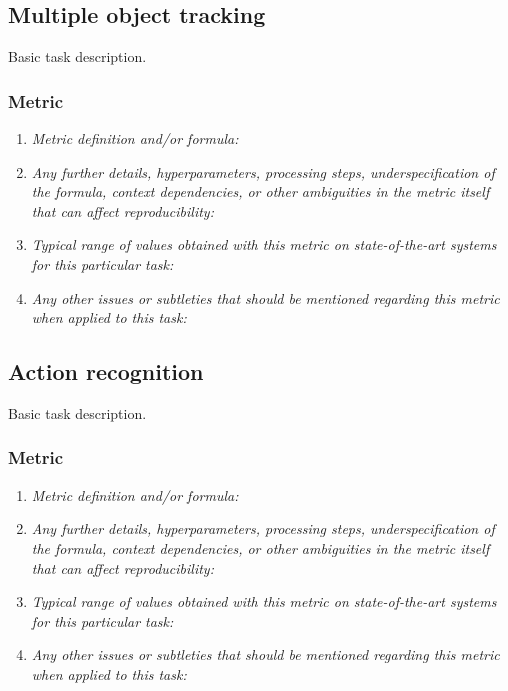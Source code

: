 \documentclass[a4paper,11pt]{article}
\begin{document}
\subsection{Multiple object tracking}
    Basic task description.
    \subsubsection{Metric}
        \begin{enumerate}[label=\alph*.]
            \item \textit{Metric definition and/or formula:}
            \bigskip
            \item \textit{Any further details, hyperparameters, processing steps, underspecification of the formula, context dependencies, or other ambiguities in the metric itself that can affect reproducibility:}
            \bigskip
            \item \textit{Typical range of values obtained with this metric on state-of-the-art systems for this particular task:}
            \bigskip
            \item \textit{Any other issues or subtleties that should be mentioned regarding this metric when applied to this task:}
            \bigskip
        \end{enumerate}

\subsection{Action recognition}
    Basic task description.
    \subsubsection{Metric}
        \begin{enumerate}[label=\alph*.]
            \item \textit{Metric definition and/or formula:}
            \bigskip
            \item \textit{Any further details, hyperparameters, processing steps, underspecification of the formula, context dependencies, or other ambiguities in the metric itself that can affect reproducibility:}
            \bigskip
            \item \textit{Typical range of values obtained with this metric on state-of-the-art systems for this particular task:}
            \bigskip
            \item \textit{Any other issues or subtleties that should be mentioned regarding this metric when applied to this task:}
            \bigskip
        \end{enumerate}
\end{document}
